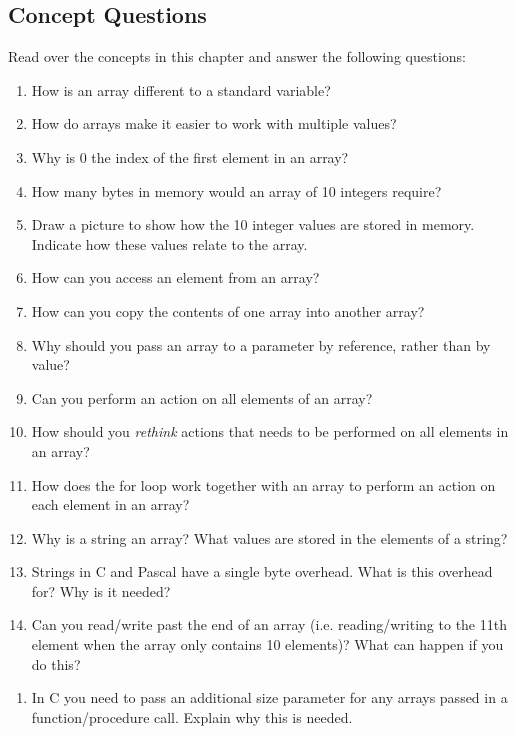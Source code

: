 \subsection{Concept Questions} %
\label{sub:array_concept_questions}

Read over the concepts in this chapter and answer the following questions:
\begin{enumerate}
  \item How is an array different to a standard variable?
  \item How do arrays make it easier to work with multiple values?
  \item Why is 0 the index of the first element in an array?
  \item How many bytes in memory would an array of 10 integers require?
  \item Draw a picture to show how the 10 integer values are stored in memory. Indicate how these values relate to the array.
  \item How can you access an element from an array?
  \item How can you copy the contents of one array into another array?
  \item Why should you pass an array to a parameter by reference, rather than by value?
  \item Can you perform an action on all elements of an array?
  \item How should you \emph{rethink} actions that needs to be performed on all elements in an array?
  \item How does the for loop work together with an array to perform an action on each element in an array?
  \item Why is a string an array? What values are stored in the elements of a string?
  \item Strings in C and Pascal have a single byte overhead. What is this overhead for? Why is it needed?
  \item Can you read/write past the end of an array (i.e. reading/writing to the 11th element when the array only contains 10 elements)? What can happen if you do this?
\end{enumerate}

\bigskip

\csection
{
\begin{enumerate}
  \item In C you need to pass an additional size parameter for any arrays passed in a function/procedure call. Explain why this is needed.
\end{enumerate}
}


